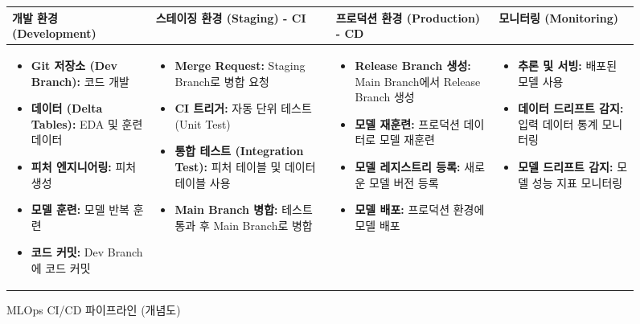 \documentclass[11pt,a4paper]{article}
\begin{document}
\begin{figure}[h!]
    \centering
    \caption{MLOps CI/CD 파이프라인 (개념도)}
    \label{fig:mlops_cicd}
    \begin{adjustbox}{width=\textwidth}
    \begin{tabular}{p{} | p{} | p{} | p{}}
    \toprule
    \textbf{개발 환경 (Development)} & \textbf{스테이징 환경 (Staging) - CI} & \textbf{프로덕션 환경 (Production) - CD} & \textbf{모니터링 (Monitoring)} \\
    \midrule
    \begin{itemize}
        \item \textbf{Git 저장소 (Dev Branch):} 코드 개발
        \item \textbf{데이터 (Delta Tables):} EDA 및 훈련 데이터
        \item \textbf{피처 엔지니어링:} 피처 생성
        \item \textbf{모델 훈련:} 모델 반복 훈련
        \item \textbf{코드 커밋:} Dev Branch에 코드 커밋
    \end{itemize} &
    \begin{itemize}
        \item \textbf{Merge Request:} Staging Branch로 병합 요청
        \item \textbf{CI 트리거:} 자동 단위 테스트 (Unit Test)
        \item \textbf{통합 테스트 (Integration Test):} 피처 테이블 및 데이터 테이블 사용
        \item \textbf{Main Branch 병합:} 테스트 통과 후 Main Branch로 병합
    \end{itemize} &
    \begin{itemize}
        \item \textbf{Release Branch 생성:} Main Branch에서 Release Branch 생성
        \item \textbf{모델 재훈련:} 프로덕션 데이터로 모델 재훈련
        \item \textbf{모델 레지스트리 등록:} 새로운 모델 버전 등록
        \item \textbf{모델 배포:} 프로덕션 환경에 모델 배포
    \end{itemize} &
    \begin{itemize}
        \item \textbf{추론 및 서빙:} 배포된 모델 사용
        \item \textbf{데이터 드리프트 감지:} 입력 데이터 통계 모니터링
        \item \textbf{모델 드리프트 감지:} 모델 성능 지표 모니터링

\end{itemize}
\end{tabular}
\end{adjustbox}
\end{figure}
\end{document}
